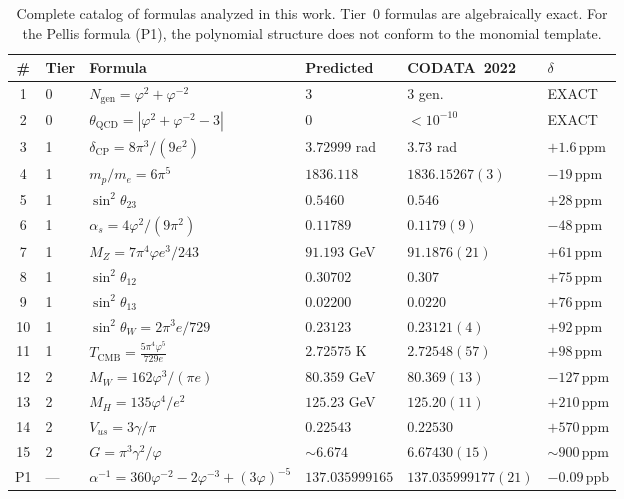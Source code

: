 \documentclass[11pt,a4paper]{article}
\newcommand{\vp}{\varphi}
\newcommand{\Ngen}{N_{\mathrm{gen}}}
\newcommand{\ppm}{\,\mathrm{ppm}}
\newcommand{\ppb}{\,\mathrm{ppb}}
\begin{document}
\begin{table}[H]
\centering
\caption{Complete catalog of formulas analyzed in this work. Tier~0 formulas
  are algebraically exact. For the Pellis formula (P1), the polynomial
  structure does not conform to the monomial template.}
\label{tab:catalog}
\small
\begin{tabular}{@{}clp{3.5cm}lll@{}}
\toprule
\# & Tier & Formula & Predicted & CODATA~2022 & $\delta$ \\
\midrule
1  & 0 & $\Ngen=\vp^{2}+\vp^{-2}$ & 3 & 3 gen. & EXACT \\
2  & 0 & $\theta_{\mathrm{QCD}}=|\vp^{2}+\vp^{-2}-3|$ & 0 & $<10^{-10}$ & EXACT \\
3  & 1 & $\delta_{\mathrm{CP}}=8\pi^{3}/(9e^{2})$ & $3.72999$ rad & $3.73$ rad & $+1.6\ppm$ \\
4  & 1 & $m_p/m_e=6\pi^{5}$ & $1836.118$ & $1836.15267(3)$ & $-19\ppm$ \\
5  & 1 & $\sin^{2}\!\theta_{23}$ & $0.5460$ & $0.546$ & $+28\ppm$ \\
6  & 1 & $\alpha_s=4\vp^{2}/(9\pi^{2})$ & $0.11789$ & $0.1179(9)$ & $-48\ppm$ \\
7  & 1 & $M_Z=7\pi^{4}\vp e^{3}/243$ & $91.193$ GeV & $91.1876(21)$ & $+61\ppm$ \\
8  & 1 & $\sin^{2}\!\theta_{12}$ & $0.30702$ & $0.307$ & $+75\ppm$ \\
9  & 1 & $\sin^{2}\!\theta_{13}$ & $0.02200$ & $0.0220$ & $+76\ppm$ \\
10 & 1 & $\sin^{2}\!\theta_W=2\pi^{3}e/729$ & $0.23123$ & $0.23121(4)$ & $+92\ppm$ \\
11 & 1 & $T_{\mathrm{CMB}}=\frac{5\pi^{4}\vp^{5}}{729e}$ & $2.72575$ K & $2.72548(57)$ & $+98\ppm$ \\
12 & 2 & $M_W=162\vp^{3}/(\pi e)$ & $80.359$ GeV & $80.369(13)$ & $-127\ppm$ \\
13 & 2 & $M_H=135\vp^{4}/e^{2}$ & $125.23$ GeV & $125.20(11)$ & $+210\ppm$ \\
14 & 2 & $V_{us}=3\gamma/\pi$ & $0.22543$ & $0.22530$ & $+570\ppm$ \\
15 & 2 & $G=\pi^{3}\gamma^{2}/\vp$ & ${\sim}6.674$ & $6.67430(15)$ & ${\sim}900\ppm$ \\
\midrule
P1 & --- & $\alpha^{-1}=360\vp^{-2}-2\vp^{-3}+(3\vp)^{-5}$ & $137.035999165$ & $137.035999177(21)$ & $-0.09\ppb$ \\
\bottomrule
\end{tabular}
\end{table}
\end{document}
